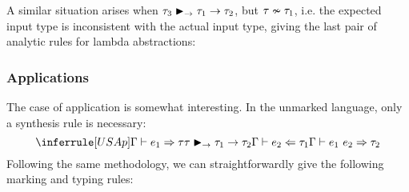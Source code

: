A similar situation arises when $\matchedArrow{\TMV_3}{\TMV_1}{\TMV_2}$, but
$\inconsistent{\TMV}{\TMV_1}$, i.e. the expected input type is inconsistent with the actual input
type, giving the last pair of analytic rules for lambda abstractions:
%
\begin{mathpar}

\end{mathpar}

\subsubsection{Applications}
\label{sec:calculus-applications}

The case of application is somewhat interesting. In the unmarked language, only a synthesis rule is
necessary:
\[%
  \judgment{
    \ctxSynType{\ctx}{\EMV_1}{\TMV} \\
    \matchedArrow{\TMV}{\TMV_1}{\TMV_2} \\
    \ctxAnaType{\ctx}{\EMV_2}{\TMV_1}
  }{
    \ctxSynType{\ctx}{\EAp{\EMV_1}{\EMV_2}}{\TMV_2}
  }{USAp}
\]%
Following the same methodology, we can straightforwardly give the following marking and typing
rules:
%
\begin{mathpar}

\end{mathpar}

